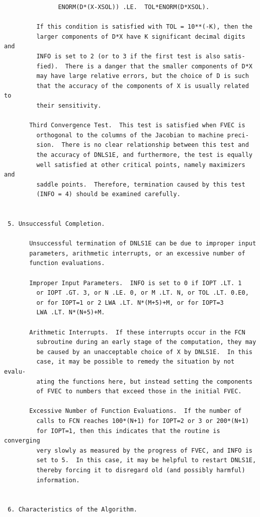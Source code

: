 \documentclass[11pt,twoside]{article}
\begin{document}
\begin{verbatim}
               ENORM(D*(X-XSOL)) .LE.  TOL*ENORM(D*XSOL).

         If this condition is satisfied with TOL = 10**(-K), then the
         larger components of D*X have K significant decimal digits and
         INFO is set to 2 (or to 3 if the first test is also satis-
         fied).  There is a danger that the smaller components of D*X
         may have large relative errors, but the choice of D is such
         that the accuracy of the components of X is usually related to
         their sensitivity.

       Third Convergence Test.  This test is satisfied when FVEC is
         orthogonal to the columns of the Jacobian to machine preci-
         sion.  There is no clear relationship between this test and
         the accuracy of DNLS1E, and furthermore, the test is equally
         well satisfied at other critical points, namely maximizers and
         saddle points.  Therefore, termination caused by this test
         (INFO = 4) should be examined carefully.


 5. Unsuccessful Completion.

       Unsuccessful termination of DNLS1E can be due to improper input
       parameters, arithmetic interrupts, or an excessive number of
       function evaluations.

       Improper Input Parameters.  INFO is set to 0 if IOPT .LT. 1
         or IOPT .GT. 3, or N .LE. 0, or M .LT. N, or TOL .LT. 0.E0,
         or for IOPT=1 or 2 LWA .LT. N*(M+5)+M, or for IOPT=3
         LWA .LT. N*(N+5)+M.

       Arithmetic Interrupts.  If these interrupts occur in the FCN
         subroutine during an early stage of the computation, they may
         be caused by an unacceptable choice of X by DNLS1E.  In this
         case, it may be possible to remedy the situation by not evalu-
         ating the functions here, but instead setting the components
         of FVEC to numbers that exceed those in the initial FVEC.

       Excessive Number of Function Evaluations.  If the number of
         calls to FCN reaches 100*(N+1) for IOPT=2 or 3 or 200*(N+1)
         for IOPT=1, then this indicates that the routine is converging
         very slowly as measured by the progress of FVEC, and INFO is
         set to 5.  In this case, it may be helpful to restart DNLS1E,
         thereby forcing it to disregard old (and possibly harmful)
         information.


 6. Characteristics of the Algorithm.


\end{verbatim}
\end{document}
